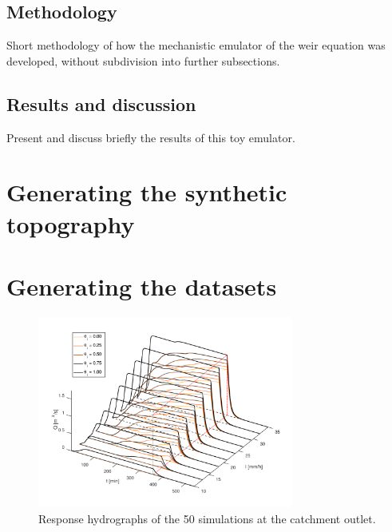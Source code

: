 \subsection{Methodology}

Short methodology of how the mechanistic emulator of the weir equation was developed, without subdivision into further subsections.


\subsection{Results and discussion}

Present and discuss briefly the results of this toy emulator.


\section{Generating the synthetic topography}








\section{Generating the datasets}




\begin{figure}[htpb]
  \centering
  \includegraphics[width=0.75\textwidth]{Figures/hydrographs3d.png}
  \caption{Response hydrographs of the \num{50} simulations at the catchment outlet.}
  \label{fig:hydrographs3d}
\end{figure}


